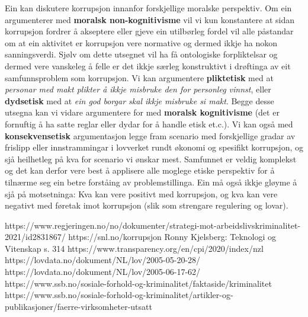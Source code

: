 \documentclass[12pt,a4paper]{article}
\begin{document}
Ein kan diskutere korrupsjon innanfor forskjellige moralske perspektiv. Om ein argumenterer med \textbf{moralsk non-kognitivisme} vil vi kun konstantere at sidan korrupsjon fordrer å akseptere eller gjeve ein utilbørleg fordel vil alle påstandar om at ein aktivitet er korrupsjon vere normative og dermed ikkje ha nokon sanningsverdi. Sjølv om dette utsegnet vil ha få ontologiske forpliktelsar og dermed vere vanskeleg å felle er det ikkje særleg konstruktivt i drøftinga av eit samfunnsproblem som korrupsjon. Vi kan argumentere \textbf{pliktetisk} med at \textit{personar med makt plikter å ikkje misbruke den for personleg vinnst}, eller \textbf{dydsetisk} med at \textit{ein god borgar skal ikkje misbruke si makt}. Begge desse utsegna kan vi vidare argumentere for med \textbf{moralsk kognitivisme} (det er fornuftig å ha satte reglar eller dydar for å handle etisk et.c.). Vi kan også med \textbf{konsekvensetisk} argumentasjon legge fram scenario med forskjellige gradar av frislipp eller innstrammingar i lovverket rundt økonomi og spesifikt korrupsjon, og sjå heilhetleg på kva for scenario vi ønskar mest. Samfunnet er veldig komplekst og det kan derfor vere best å applisere alle moglege etiske perspektiv for å tilnærme seg ein betre forståing av problemstillinga. Ein må også ikkje gløyme å sjå på motsetninga: Kva kan vere positivt med korrupsjon, og kva kan vere negativt med føretak imot korrupsjon (slik som strengare regulering og lovar).




\begin{thebibliography}{1}
   https://www.regjeringen.no/no/dokumenter/strategi-mot-arbeidslivskriminalitet-2021/id2831867/
   https://snl.no/korrupsjon
   Ronny Kjelsberg: Teknologi og Vitenskap s. 314
   https://www.transparency.org/en/cpi/2020/index/nzl
   https://lovdata.no/dokument/NL/lov/2005-05-20-28/
   https://lovdata.no/dokument/NL/lov/2005-06-17-62/
   https://www.ssb.no/sosiale-forhold-og-kriminalitet/faktaside/kriminalitet
   https://www.ssb.no/sosiale-forhold-og-kriminalitet/artikler-og-publikasjoner/faerre-virksomheter-utsatt
\end{thebibliography}


	
\end{document}
